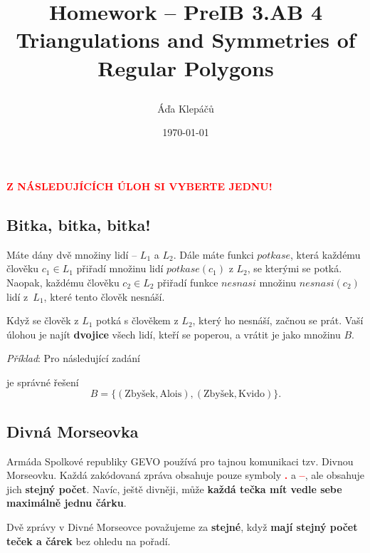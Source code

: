 \documentclass[a4paper,11pt]{article}
\title{\Huge\textsf{Homework -- PreIB 3.AB 4}\\
 \Large\textsf{Triangulations and Symmetries of Regular Polygons}
 \author{Áďa Klepáčů}
 \date{\today}
}
\newcommand{\clr}{\textcolor{red}}
\newcommand{\clb}{\textcolor{blue}}
\begin{document}
\thispagestyle{fancy}

\clr{\textbf{\uppercase{Z následujících úloh si vyberte jednu!}}}

\subsection*{Bitka, bitka, bitka!}
Máte dány dvě množiny lidí -- $L_1$ a $L_2$. Dále máte funkci $potkase$, která
každému člověku $c_1 \in L_1$ přiřadí množinu lidí $potkase(c_1)$ z $L_2$, se
kterými se potká. Naopak, každému člověku $c_2 \in L_2$ přiřadí funkce $nesnasi$
množinu $nesnasi(c_2)$ lidí z~$L_1$, které tento člověk nesnáší.

Když se člověk z $L_1$ potká s člověkem z $L_2$, který ho nesnáší, začnou se
prát. Vaší úlohou je najít \textbf{dvojice} všech lidí, kteří se poperou, a
vrátit je jako množinu $B$.

\emph{Příklad}: Pro následující zadání
\begin{center}
\end{center}
je správné řešení
\[
 B = \{(\text{Zbyšek}, \text{Alois}), (\text{Zbyšek}, \text{Kvido})\}.
\]
\clearpage

\subsection*{Divná Morseovka}

Armáda Spolkové republiky GEVO používá pro tajnou komunikaci tzv. Divnou
Morseovku. Každá zakódovaná zpráva obsahuje pouze symboly \clr{\textbf{.}} a
\clr{\textbf{--}}, ale obsahuje jich \textbf{stejný počet}. Navíc, ještě
divněji, může \textbf{každá tečka mít vedle sebe maximálně jednu čárku}.

Dvě zprávy v Divné Morseovce považujeme za \textbf{stejné}, když \textbf{mají
stejný počet teček a čárek} bez ohledu na pořadí.
\end{document}

